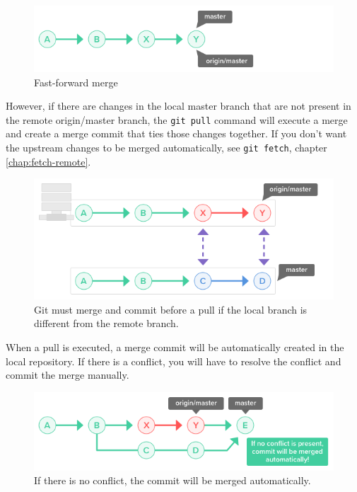 \documentclass[10pt,a4paper,english]{report}
\begin{document}
    \begin{figure}[ht]
    \begin{center}
    \includegraphics[scale=0.5]{images/pull_remote_branch_002.png}
    \end{center}
    \caption{Fast-forward merge}
    \end{figure}

    However, if there are changes in the local master branch that are not present in the remote origin/master branch, the \verb|git pull| command will execute a merge and create a merge commit that ties those changes together. If you don't want the upstream changes to be merged automatically, see \verb|git fetch|, chapter \ref{chap:fetch-remote}.

    \begin{figure}[ht]
    \begin{center}
    \includegraphics[scale=0.5]{images/pull_remote_branch_003.png}
    \end{center}
    \caption{Git must merge and commit before a pull if the local branch is different from the remote branch.}
    \end{figure}

    When a pull is executed, a merge commit will be automatically created in the local repository. If there is a conflict, you will have to resolve the conflict and commit the merge manually.

    \begin{figure}[ht]
    \begin{center}
    \includegraphics[scale=0.5]{images/pull_remote_branch_004.png}
    \end{center}
    \caption{If there is no conflict, the commit will be merged automatically.}
    \end{figure}
\end{document}
